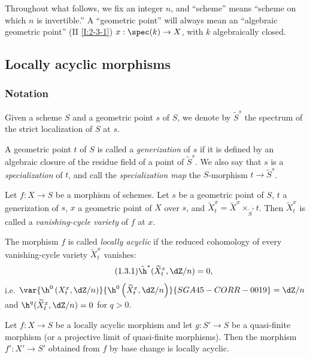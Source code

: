 Throughout what follows, we fix an integer $n$, and “scheme” means
“scheme on which $n$ is invertible.” A “geometric point” will always mean
an “algebraic geometric point” (II \ref{I:2-3-1})
$x:\spec(k)\to X$, with $k$ algebraically closed.

\subsection{Locally acyclic morphisms}\label{I:5-1}

\subsubsection{Notation}\label{I:5-1-1}

Given a scheme $S$ and a geometric point $s$ of $S$, we denote by
$\widetilde S^s$ the spectrum of the strict localization of $S$ at $s$.

\begin{definition}\label{I:5-1-2}
A geometric point $t$ of $S$ is called a \emph{generization} of $s$ if
it is defined by an algebraic closure of the residue field of a point of
$\widetilde S^s$. We also say that $s$ is a \emph{specialization} of
$t$, and call the \emph{specialization map} the $S$-morphism
$t\to\widetilde S^s$.
\end{definition}

\begin{definition}\label{I:5-1-3}
Let $f:X\to S$ be a morphism of schemes. Let $s$ be a geometric point
of $S$, $t$ a generization of $s$, $x$ a geometric point of $X$ over
$s$, and
$\widetilde X_t^x=\widetilde X^x\times_{\widetilde S^s}t$. Then
$\widetilde X_t^x$ is called a \emph{vanishing-cycle variety} of $f$ at
$x$.

The morphism $f$ is called \emph{locally acyclic} if the reduced
cohomology of every vanishing-cycle variety $\widetilde X_t^x$ vanishes:
\begin{equation*}\tag{1.3.1}\label{I:eq:5-1-3-1}
  \hat\h^*(\widetilde X_t^x,\dZ/n) = 0\text{,}
\end{equation*}
i.e. $\var{\h^0\left(X_t^x,\dZ/n\right)}{\h^0\left(\widetilde X_t^x,\dZ/n\right)}{SGA45-CORR-0019}=\dZ/n$ and
$\h^q(\widetilde X_t^x,\dZ/n)=0$ for $q>0$.
\end{definition}

\begin{lemma}\label{I:5-1-4}
Let $f:X\to S$ be a locally acyclic morphism and let $g:S'\to S$ be a
quasi-finite morphism (or a projective limit of quasi-finite morphisms).
Then the morphism $f':X'\to S'$ obtained from $f$ by base change is
locally acyclic.
\end{lemma}

